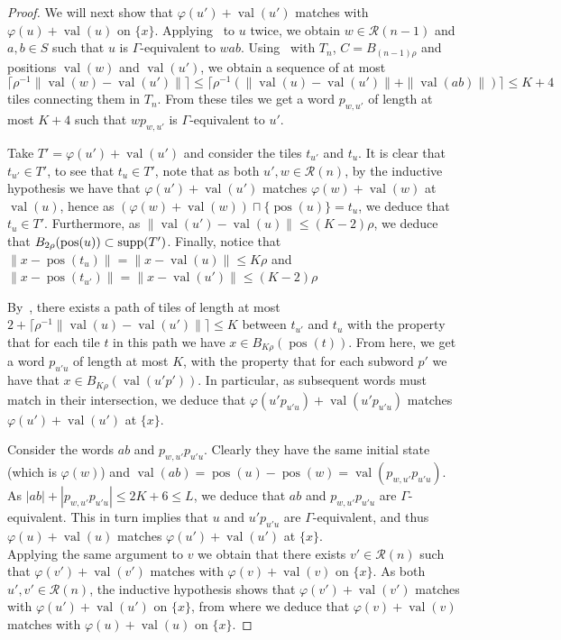 \documentclass{article}
\theoremstyle{definition}
\theoremstyle{definition}
\newcommand{\norm}[1]{\|{#1}\|}
\newcommand{\val}{\operatorname{val}}
\newcommand{\pos}{\operatorname{pos}}
\newcommand{\supp}{\textnormal{supp}}
\begin{document}
\begin{proof}
    We will next show that $\varphi(u')+\val(u')$ matches with $\varphi(u)+\val(u)$ on $\{x\}$. 
    Applying~ to $u$ twice, we obtain $w \in \mathcal{R}(n-1)$ and $a,b \in S$ such that $u$ is $\Gamma$-equivalent to $wab$. Using~ with $T_n$, $C=B_{(n-1)\rho}$ and positions $\val(w)$ and $\val(u')$, we obtain a sequence of at most \[\lceil \rho^{-1}\norm{\val(w)-\val(u')}\rceil \leq \lceil \rho^{-1}(\norm{\val(u)-\val(u')} + \norm{\val(ab)})\rceil \leq K+4\] tiles connecting them in $T_n$. From these tiles we get a word $p_{w,u'}$ of length at most $K+4$ such that $wp_{w,u'}$ is $\Gamma$-equivalent to $u'$.

    Take $T' = \varphi(u')+\val(u')$ and consider the tiles $t_{u'}$ and $t_u$. It is clear that $t_{u'} \in T'$, to see that $t_u \in T'$, note that as both $u', w \in \mathcal{R}(n)$, by the inductive hypothesis we have that $\varphi(u')+\val(u')$ matches $\varphi(w)+\val(w)$ at $\val(u)$, hence as $(\varphi(w)+\val(w))\sqcap \{\pos(u)\} = t_u$, we deduce that $t_u \in T'$. Furthermore, as $\norm{\val(u')-\val(u)} \leq (K-2)\rho$, we deduce that $B_{2\rho}(\pos(u))\subset \supp(T')$. Finally, notice that $\norm{x-\pos(t_{u})} = \norm{x-\val(u)} \leq K\rho$ and $\norm{x-\pos(t_{u'})} = \norm{x-\val(u')} \leq (K-2)\rho$ 

    By~, there exists a path of tiles of length at most $2 + \lceil\rho^{-1}\norm{\val(u)-\val(u')} \rceil \leq K$ between $t_{u'}$ and $t_u$ with the property that for each tile $t$ in this path we have $x \in B_{K\rho}(\pos(t))$. From here, we get a word $p_{u'u}$ of length at most $K$, with the property that for each subword $p'$ we have that $x \in B_{K\rho}(\val(u'p'))$. In particular, as subsequent words must match in their intersection, we deduce that $\varphi(u'p_{u'u})+\val(u'p_{u'u})$ matches $\varphi(u')+\val(u')$ at $\{x\}$.

    Consider the words $ab$ and $p_{w,u'}p_{u'u}$. Clearly they have the same initial state (which is $\varphi(w)$) and $\val(ab) = \pos(u) - \pos(w) = \val(p_{w,u'}p_{u'u})$. As $|ab|+|p_{w,u'}p_{u'u}| \leq 2K+6 \leq L$, we deduce that $ab$ and $p_{w,u'}p_{u'u}$ are $\Gamma$-equivalent. This in turn implies that $u$ and $u'p_{u'u}$ are $\Gamma$-equivalent, and thus $\varphi(u)+\val(u)$ matches $\varphi(u')+\val(u')$ at $\{x\}$.\\

    Applying the same argument to $v$ we obtain that there exists $v'\in \mathcal{R}(n)$ such that $\varphi(v')+\val(v')$ matches with $\varphi(v)+\val(v)$ on $\{x\}$. As both $u',v' \in \mathcal{R}(n)$, the inductive hypothesis shows that $\varphi(v')+\val(v')$ matches with $\varphi(u')+\val(u')$ on $\{x\}$, from where we deduce that $\varphi(v)+\val(v)$ matches with $\varphi(u)+\val(u)$ on $\{x\}$.   \end{proof}
\end{document}
